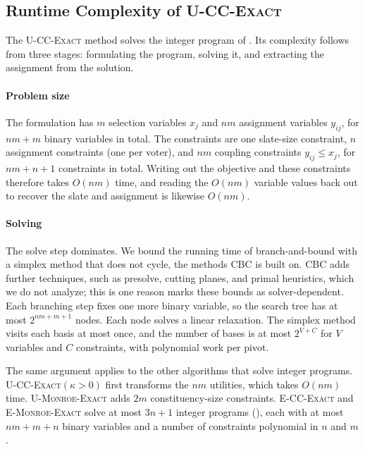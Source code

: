 \documentclass[letterpaper]{article} %
\newcommand{\Exact}{\textsc{U-CC-Exact}}
\newcommand{\ExactP}{\textsc{U-CC-Exact}$(\kappa>0)$}
\newcommand{\ExactMonroe}{\textsc{U-Monroe-Exact}}
\newcommand{\EExactMonroe}{\textsc{E-Monroe-Exact}}
\newcommand{\ECCExact}{\textsc{E-CC-Exact}}
\begin{document}
\subsection{Runtime Complexity of \Exact{}} \label{app:brute-force-vs-exact}
The \Exact{} method solves the integer program of .
Its complexity follows from three stages: formulating the program, solving it, and extracting the assignment from the solution.

\paragraph{Problem size} The formulation has $m$ selection variables $x_j$ and $nm$ assignment variables $y_{ij}$, for $nm+m$ binary variables in total.
The constraints are one slate-size constraint, $n$ assignment constraints (one per voter), and $nm$ coupling constraints $y_{ij}\le x_j$, for $nm+n+1$ constraints in total.
Writing out the objective and these constraints therefore takes $O(nm)$ time, and reading the $O(nm)$ variable values back out to recover the slate and assignment is likewise $O(nm)$.

\paragraph{Solving} The solve step dominates.
We bound the running time of branch-and-bound with a simplex method that does not cycle, the methods CBC is built on.
CBC adds further techniques, such as presolve, cutting planes, and primal heuristics, which we do not analyze; this is one reason  marks these bounds as solver-dependent.
Each branching step fixes one more binary variable, so the search tree has at most \(2^{nm+m+1}\) nodes.
Each node solves a linear relaxation.
The simplex method visits each basis at most once, and the number of bases is at most \(2^{V+C}\) for \(V\) variables and \(C\) constraints, with polynomial work per pivot.

The same argument applies to the other algorithms that solve integer programs.
\ExactP{} first transforms the \(nm\) utilities, which takes \(O(nm)\) time.
\ExactMonroe{} adds \(2m\) constituency-size constraints.
\ECCExact{} and \EExactMonroe{} solve at most \(3n+1\) integer programs (), each with at most \(nm+m+n\) binary variables and a number of constraints polynomial in \(n\) and \(m\).
\end{document}

